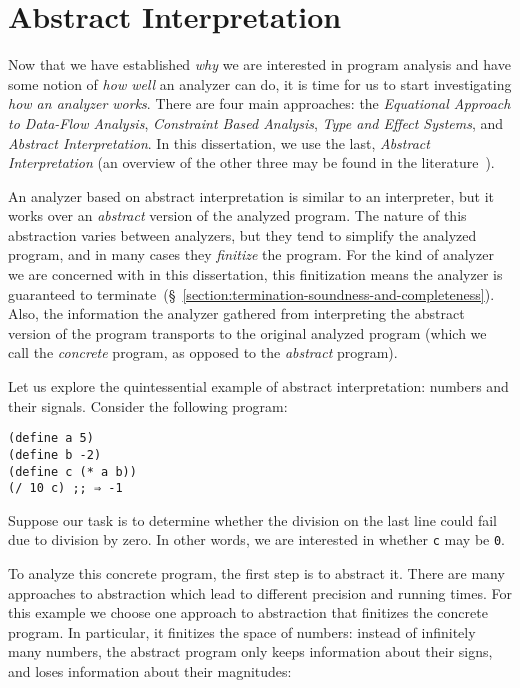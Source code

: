 \documentclass[12pt, oneside]{book}
\begin{document}
\section{Abstract Interpretation}

Now that we have established \emph{why} we are interested in program analysis and have some notion of \emph{how well} an analyzer can do, it is time for us to start investigating \emph{how an analyzer works}. There are four main approaches: the \emph{Equational Approach to Data-Flow Analysis}, \emph{Constraint Based Analysis}, \emph{Type and Effect Systems}, and \emph{Abstract Interpretation}. In this dissertation, we use the last, \emph{Abstract Interpretation} (an overview of the other three may be found in the literature~\cite{blue-book}).

An analyzer based on abstract interpretation is similar to an interpreter, but it works over an \emph{abstract} version of the analyzed program. The nature of this abstraction varies between analyzers, but they tend to simplify the analyzed program, and in many cases they \emph{finitize} the program. For the kind of analyzer we are concerned with in this dissertation, this finitization means the analyzer is guaranteed to terminate~(§~\ref{section:termination-soundness-and-completeness}). Also, the information the analyzer gathered from interpreting the abstract version of the program transports to the original analyzed program (which we call the \emph{concrete} program, as opposed to the \emph{abstract} program).

Let us explore the quintessential example of abstract interpretation: numbers and their signals. Consider the following program:

\begin{Verbatim}
(define a 5)
(define b -2)
(define c (* a b))
(/ 10 c) ;; ⇒ -1
\end{Verbatim}

Suppose our task is to determine whether the division on the last line could fail due to division by zero. In other words, we are interested in whether \texttt{c} may be \texttt{0}.

To analyze this concrete program, the first step is to abstract it. There are many approaches to abstraction which lead to different precision and running times. For this example we choose one approach to abstraction that finitizes the concrete program. In particular, it finitizes the space of numbers: instead of infinitely many numbers, the abstract program only keeps information about their signs, and loses information about their magnitudes:
\end{document}
